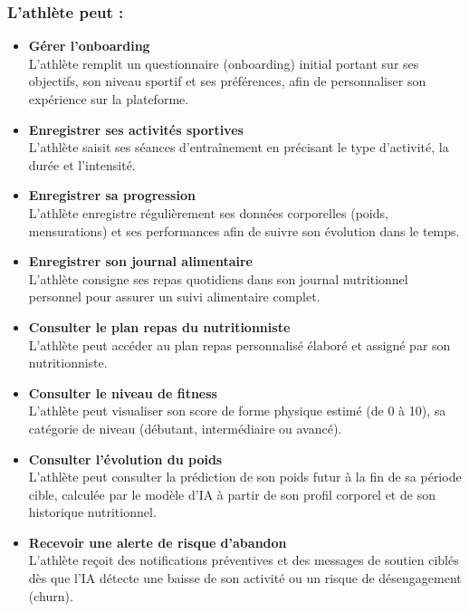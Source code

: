 ﻿\documentclass[a4paper,12pt]{report}
\begin{document}
\subsubsection*{L'athlète peut :}
\begin{itemize}
    
    \item \textbf{Gérer l'onboarding} \\
    L'athlète remplit un questionnaire (onboarding) initial portant sur 
    ses objectifs, son niveau sportif et ses préférences, afin de personnaliser son expérience 
    sur la plateforme.
    
    \item \textbf{Enregistrer ses activités sportives} \\
    L'athlète saisit ses séances d'entraînement 
    en précisant le type d'activité, la durée et l'intensité. 
   
    \item \textbf{Enregistrer sa progression} \\
    L'athlète enregistre régulièrement ses données 
    corporelles (poids, mensurations) et ses performances afin de suivre son évolution dans 
    le temps.
    \item \textbf{Enregistrer son journal alimentaire} \\
    L'athlète consigne ses repas quotidiens 
    dans son journal nutritionnel personnel pour assurer un suivi alimentaire complet.
    \item \textbf{Consulter le plan repas du nutritionniste} \\
    L'athlète peut accéder au plan 
    repas personnalisé élaboré et assigné par son nutritionniste.
 \item \textbf{Consulter le niveau de fitness} \\
    L’athlète peut visualiser son score de forme physique estimé (de 0 à 10), sa catégorie de niveau (débutant, intermédiaire ou avancé).

    \item \textbf{Consulter l’évolution du poids} \\
    L’athlète peut consulter la prédiction de son poids futur à la fin de sa période cible, calculée par le modèle d'IA à partir de son profil corporel et de son historique nutritionnel.

    \item \textbf{Recevoir une alerte de risque d’abandon} \\
    L’athlète reçoit des notifications préventives et des messages de soutien ciblés dès que l'IA détecte une baisse de son activité ou un risque de désengagement (churn).



\end{itemize}
\end{document}
